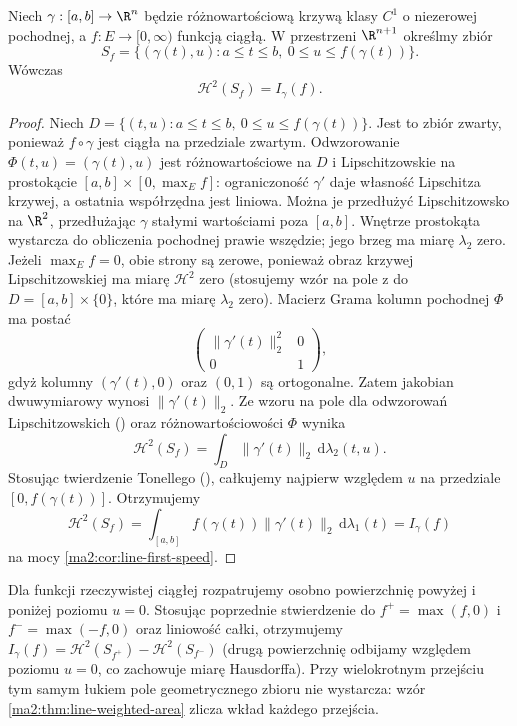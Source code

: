 \begin{stwierdzenie}
\label{ma2:prop:line-curtain-area}
Niech $\gamma:[a,b]\to\R^n$ będzie różnowartościową
krzywą klasy $C^1$ o niezerowej pochodnej,
a $f:E\to[0,\infty)$ funkcją ciągłą.
W przestrzeni $\R^{n+1}$ określmy zbiór
\[
 S_f=\{(\gamma(t),u):a\le t\le b,\
                       0\le u\le f(\gamma(t))\}.
\]
Wówczas
\[
 \mathcal H^2(S_f)=I_\gamma(f).
\]
\end{stwierdzenie}
\begin{proof}
Niech $D=\{(t,u):a\le t\le b,\
0\le u\le f(\gamma(t))\}$. Jest to zbiór zwarty,
ponieważ $f\circ\gamma$ jest ciągła na przedziale
zwartym. Odwzorowanie $\Phi(t,u)=(\gamma(t),u)$
jest różnowartościowe na $D$ i Lipschitzowskie
na prostokącie $[a,b]\times[0,\max_E f]$:
ograniczoność $\gamma'$ daje własność Lipschitza
krzywej, a ostatnia współrzędna jest liniowa.
Można je przedłużyć Lipschitzowsko na $\R^2$,
przedłużając $\gamma$ stałymi wartościami poza
$[a,b]$. Wnętrze prostokąta wystarcza do obliczenia
pochodnej prawie wszędzie; jego brzeg ma miarę
$\lambda_2$ zero. Jeżeli $\max_E f=0$, obie strony
są zerowe, ponieważ obraz krzywej Lipschitzowskiej
ma miarę $\mathcal H^2$ zero (stosujemy wzór na pole
z 
do $D=[a,b]\times\{0\}$, które ma miarę $\lambda_2$ zero).
Macierz Grama kolumn pochodnej $\Phi$ ma postać
\[
 \begin{pmatrix}
 \|\gamma'(t)\|_2^2 & 0\\
 0&1
 \end{pmatrix},
\]
gdyż kolumny $(\gamma'(t),0)$ oraz $(0,1)$
są ortogonalne. Zatem jakobian dwuwymiarowy
wynosi $\|\gamma'(t)\|_2$.
Ze wzoru na pole dla odwzorowań Lipschitzowskich
()
oraz różnowartościowości $\Phi$ wynika
\[
 \mathcal H^2(S_f)
 =\int_D\|\gamma'(t)\|_2\,\mathrm d\lambda_2(t,u).
\]
Stosując twierdzenie Tonellego
(),
całkujemy najpierw względem $u$ na przedziale
$[0,f(\gamma(t))]$. Otrzymujemy
\[
 \mathcal H^2(S_f)
 =\int_{[a,b]} f(\gamma(t))\|\gamma'(t)\|_2\,
                  \mathrm d\lambda_1(t)=I_\gamma(f)
\]
na mocy \ref{ma2:cor:line-first-speed}.
\end{proof}

Dla funkcji rzeczywistej ciągłej rozpatrujemy
osobno powierzchnię powyżej i poniżej poziomu
$u=0$. Stosując poprzednie stwierdzenie do
$f^+=\max(f,0)$ i $f^-=\max(-f,0)$
oraz liniowość całki, otrzymujemy
$I_\gamma(f)=\mathcal H^2(S_{f^+})-
\mathcal H^2(S_{f^-})$ (drugą powierzchnię
odbijamy względem poziomu $u=0$, co zachowuje
miarę Hausdorffa).
Przy wielokrotnym przejściu tym samym łukiem
pole geometrycznego zbioru nie wystarcza:
wzór \ref{ma2:thm:line-weighted-area} zlicza
wkład każdego przejścia.

